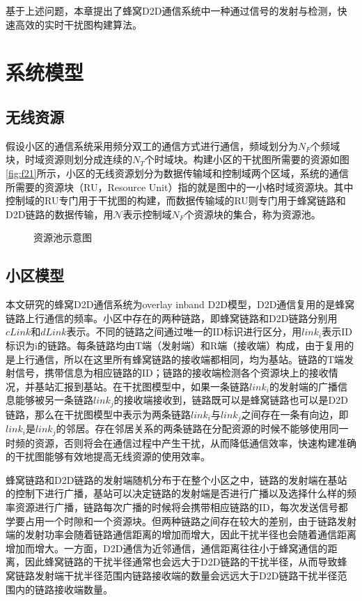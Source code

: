 \documentclass[figurelist,tablelist,algorithmlist,nomlist,masters]{seuthesix}
\begin{document}
	基于上述问题，本章提出了蜂窝D2D通信系统中一种通过信号的发射与检测，快速高效的实时干扰图构建算法。
	
	\section{系统模型}
	\subsection{无线资源}
	假设小区的通信系统采用频分双工的通信方式进行通信，频域划分为$N_{F}$个频域块，时域资源则划分成连续的$N_{T}$个时域块。构建小区的干扰图所需要的资源如图\ref{fig:f21}所示，小区的无线资源划分为数据传输域和控制域两个区域，系统的通信所需要的资源块（RU，Resource Unit）指的就是图中的一小格时域资源块。其中控制域的RU专门用于干扰图的构建，而数据传输域的RU则专门用于蜂窝链路和D2D链路的数据传输，用$\mathcal{N}$表示控制域$N_{F}$个资源块的集合，称为资源池。
	\begin{figure}[htb]
		\centering
		\caption{资源池示意图}\label{f21}
	\end{figure}
	
	\subsection{小区模型}
	本文研究的蜂窝D2D通信系统为overlay inband D2D模型，D2D通信复用的是蜂窝链路上行通信的频率。小区中存在的两种链路，即蜂窝链路和D2D链路分别用$cLink$和$dLink$表示。不同的链路之间通过唯一的ID标识进行区分，用$link_i$表示ID标识为i的链路。每条链路均由T端（发射端）和R端（接收端）构成，由于复用的是上行通信，所以在这里所有蜂窝链路的接收端都相同，均为基站。链路的T端发射信号，携带信息为相应链路的ID；链路的接收端检测各个资源块上的接收情况，并基站汇报到基站。在干扰图模型中，如果一条链路$link_i$的发射端的广播信息能够被另一条链路$link_j$的接收端接收到，链路既可以是蜂窝链路也可以是D2D链路，那么在干扰图模型中表示为两条链路$link_i$与$link_j$之间存在一条有向边，即$link_i$是$link_j$的邻居。存在邻居关系的两条链路在分配资源的时候不能够使用同一时频的资源，否则将会在通信过程中产生干扰，从而降低通信效率，快速构建准确的干扰图能够有效地提高无线资源的使用效率。
	
	蜂窝链路和D2D链路的发射端随机分布于在整个小区之中，链路的发射端在基站的控制下进行广播，基站可以决定链路的发射端是否进行广播以及选择什么样的频率资源进行广播，链路每次广播的时候将会携带相应链路的ID，每次发送信号都学要占用一个时隙和一个资源块。但两种链路之间存在较大的差别，由于链路发射端的发射功率会随着链路通信距离的增加而增大，因此干扰半径也会随着通信距离增加而增大。一方面，D2D通信为近邻通信，通信距离往往小于蜂窝通信的距离，因此蜂窝链路的干扰半径通常也会远大于D2D链路的干扰半径，从而导致蜂窝链路发射端干扰半径范围内链路接收端的数量会远远大于D2D链路干扰半径范围内的链路接收端数量。
	
\end{document}
